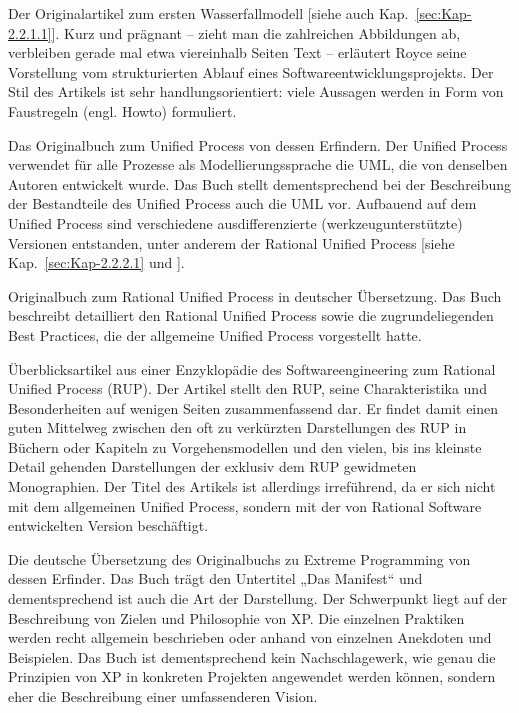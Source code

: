 {Der Originalartikel zum ersten Wasserfallmodell [siehe auch Kap.~\ref{sec:Kap-2.2.1.1}]. Kurz und prägnant – zieht man die zahlreichen Abbildungen ab, verbleiben gerade mal \mbox{etwa} viereinhalb Seiten Text – erläutert Royce seine Vorstellung vom strukturierten Ablauf eines Softwareentwicklungsprojekts. Der Stil des Artikels ist sehr handlungsorientiert: viele Aussagen werden in Form von Faustregeln (engl. Howto) formuliert.}

{Das Originalbuch zum Unified Process von dessen Erfindern. Der Unified Process verwendet für alle Prozesse als Modellierungssprache die UML, die von denselben Autoren entwickelt wurde. Das Buch stellt dementsprechend bei der Beschreibung der Bestandteile des Unified Process auch die UML vor. Aufbauend auf dem Unified Process sind verschiedene ausdifferenzierte (werkzeugunterstützte) Versionen entstanden, unter anderem der Rational Unified Process [siehe Kap.~\ref{sec:Kap-2.2.2.1} und \cite{kru99}].}

{Originalbuch zum Rational Unified Process in deutscher Übersetzung. Das Buch beschreibt detailliert den Rational Unified Process sowie die zugrundeliegenden Best Practices, die der allgemeine Unified Process \cite{jac99} vorgestellt hatte.
}

{Überblicksartikel aus einer Enzyklopädie des Softwareengineering zum Rational Unified Process (RUP). Der Artikel stellt den RUP, seine Charakteristika und Besonderheiten auf wenigen Seiten zusammenfassend dar. Er findet damit einen guten Mittelweg zwischen den oft zu verkürzten Darstellungen des RUP in Büchern oder Kapiteln zu Vorgehensmodellen und den vielen, bis ins kleinste Detail gehenden Darstellungen der exklusiv dem RUP gewidmeten Monographien. Der Titel des Artikels ist allerdings irreführend, da er sich nicht mit dem allgemeinen Unified Process, sondern mit der von Rational Software entwickelten Version beschäftigt.}

{Die deutsche Übersetzung des Originalbuchs zu Extreme Programming von dessen Erfinder. Das Buch trägt den Untertitel „Das Manifest“ und dementsprechend ist auch die Art der Darstellung. Der Schwerpunkt liegt auf der Beschreibung von Zielen und Philosophie von XP. Die einzelnen Praktiken werden recht allgemein beschrieben oder anhand von einzelnen Anekdoten und Beispielen. Das Buch ist dementsprechend kein Nachschlagewerk, wie genau die Prinzipien von XP in konkreten Projekten angewendet werden können, sondern eher die Beschreibung einer umfassenderen Vision.}

